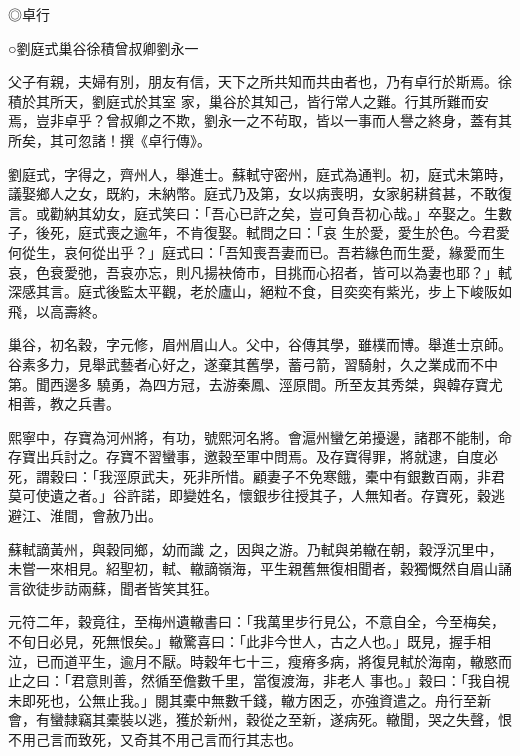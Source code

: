 \begin{pinyinscope}
 ◎卓行



 ○劉庭式巢谷徐積曾叔卿劉永一



 父子有親，夫婦有別，朋友有信，天下之所共知而共由者也，乃有卓行於斯焉。徐積於其所天，劉庭式於其室
 家，巢谷於其知己，皆行常人之難。行其所難而安焉，豈非卓乎？曾叔卿之不欺，劉永一之不茍取，皆以一事而人譽之終身，蓋有其所矣，其可忽諸！撰《卓行傳》。



 劉庭式，字得之，齊州人，舉進士。蘇軾守密州，庭式為通判。初，庭式未第時，議娶鄉人之女，既約，未納幣。庭式乃及第，女以病喪明，女家躬耕貧甚，不敢復言。或勸納其幼女，庭式笑曰：「吾心已許之矣，豈可負吾初心哉。」卒娶之。生數子，後死，庭式喪之逾年，不肯復娶。軾問之曰：「哀
 生於愛，愛生於色。今君愛何從生，哀何從出乎？」庭式曰：「吾知喪吾妻而已。吾若緣色而生愛，緣愛而生哀，色衰愛弛，吾哀亦忘，則凡揚袂倚市，目挑而心招者，皆可以為妻也耶？」軾深感其言。庭式後監太平觀，老於廬山，絕粒不食，目奕奕有紫光，步上下峻阪如飛，以高壽終。



 巢谷，初名穀，字元修，眉州眉山人。父中，谷傳其學，雖樸而博。舉進士京師。谷素多力，見舉武藝者心好之，遂棄其舊學，蓄弓箭，習騎射，久之業成而不中第。聞西邊多
 驍勇，為四方冠，去游秦鳳、涇原間。所至友其秀桀，與韓存寶尤相善，教之兵書。



 熙寧中，存寶為河州將，有功，號熙河名將。會滬州蠻乞弟擾邊，諸郡不能制，命存寶出兵討之。存寶不習蠻事，邀穀至軍中問焉。及存寶得罪，將就逮，自度必死，謂穀曰：「我涇原武夫，死非所惜。顧妻子不免寒餓，橐中有銀數百兩，非君莫可使遺之者。」谷許諾，即變姓名，懷銀步往授其子，人無知者。存寶死，穀逃避江、淮間，會赦乃出。



 蘇軾謫黃州，與穀同鄉，幼而識
 之，因與之游。乃軾與弟轍在朝，穀浮沉里中，未嘗一來相見。紹聖初，軾、轍謫嶺海，平生親舊無復相聞者，穀獨慨然自眉山誦言欲徒步訪兩蘇，聞者皆笑其狂。



 元符二年，穀竟往，至梅州遺轍書曰：「我萬里步行見公，不意自全，今至梅矣，不旬日必見，死無恨矣。」轍驚喜曰：「此非今世人，古之人也。」既見，握手相泣，已而道平生，逾月不厭。時穀年七十三，瘦瘠多病，將復見軾於海南，轍愍而止之曰：「君意則善，然循至儋數千里，當復渡海，非老人
 事也。」穀曰：「我自視未即死也，公無止我。」閱其橐中無數千錢，轍方困乏，亦強資遣之。舟行至新會，有蠻隸竊其橐裝以逃，獲於新州，穀從之至新，遂病死。轍聞，哭之失聲，恨不用己言而致死，又奇其不用己言而行其志也。




\end{pinyinscope}
